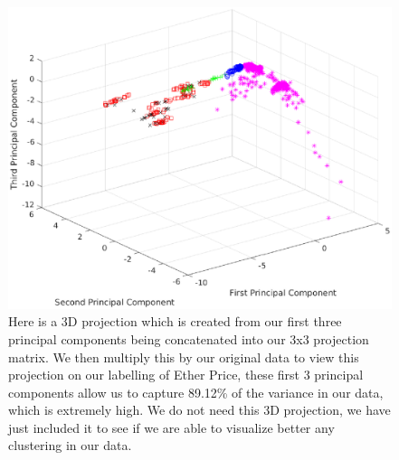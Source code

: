 \documentclass{article}
\begin{document}
\begin{figure}[H]
\centering
\caption{Here is a 3D projection which is created from our first three principal components being concatenated into our 3x3 projection matrix. We then multiply this by our original data to view this projection on our labelling of Ether Price, these first 3 principal components allow us to capture 89.12\% of the variance in our data, which is extremely high. We do not need this 3D projection, we have just included it to see if we are able to visualize better any clustering in our data.}
\includegraphics{main/eth_3d_projection.eps}
\end{figure}




\end{document}
